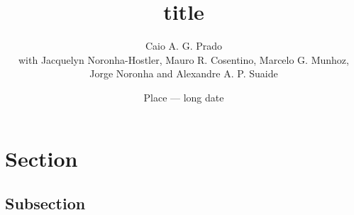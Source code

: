\documentclass[aspectratio=43,hyperref=hidelinks]{beamer}
\title[short]{title}
\author[Caio Prado]{Caio A. G. Prado\\\scriptsize
  with Jacquelyn Noronha-Hostler, Mauro R. Cosentino, Marcelo G. Munhoz,\\
  Jorge Noronha and Alexandre A. P. Suaide}
\institute{Institute or Conference Name}
\date[short]{Place --- long date}
\begin{document}

\section{Section}
\subsection{Subsection}

\begin{frame}
  
\end{frame}
\end{document}

